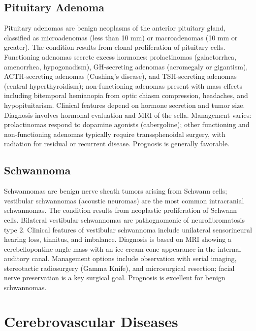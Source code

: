 \subsection{Pituitary Adenoma}
\label{sec:Pituitary Adenoma}
Pituitary adenomas are benign neoplasms of the anterior pituitary gland, classified as microadenomas (less than 10 mm) or macroadenomas (10 mm or greater). The condition results from clonal proliferation of pituitary cells. Functioning adenomas secrete excess hormones: prolactinomas (galactorrhea, amenorrhea, hypogonadism), GH-secreting adenomas (acromegaly or gigantism), ACTH-secreting adenomas (Cushing's disease), and TSH-secreting adenomas (central hyperthyroidism); non-functioning adenomas present with mass effects including bitemporal hemianopia from optic chiasm compression, headaches, and hypopituitarism. Clinical features depend on hormone secretion and tumor size. Diagnosis involves hormonal evaluation and MRI of the sella. Management varies: prolactinomas respond to dopamine agonists (cabergoline); other functioning and non-functioning adenomas typically require transsphenoidal surgery, with radiation for residual or recurrent disease. Prognosis is generally favorable.

\subsection{Schwannoma}
\label{sec:Schwannoma}
Schwannomas are benign nerve sheath tumors arising from Schwann cells; vestibular schwannomas (acoustic neuromas) are the most common intracranial schwannomas. The condition results from neoplastic proliferation of Schwann cells. Bilateral vestibular schwannomas are pathognomonic of neurofibromatosis type 2. Clinical features of vestibular schwannoma include unilateral sensorineural hearing loss, tinnitus, and imbalance. Diagnosis is based on MRI showing a cerebellopontine angle mass with an ice-cream cone appearance in the internal auditory canal. Management options include observation with serial imaging, stereotactic radiosurgery (Gamma Knife), and microsurgical resection; facial nerve preservation is a key surgical goal. Prognosis is excellent for benign schwannomas.

\section{Cerebrovascular Diseases}

